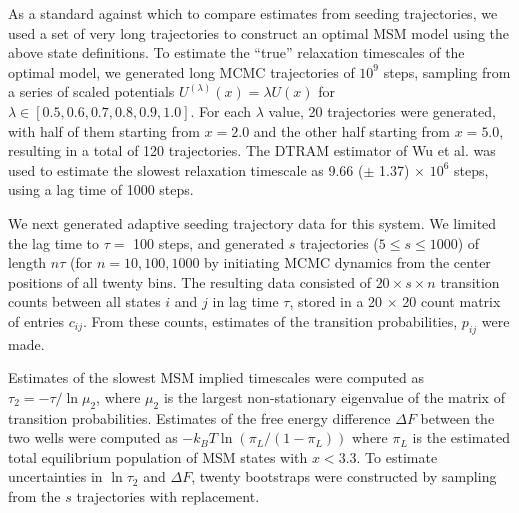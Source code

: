 \documentclass[%
 aip,
rsi,%
 amsmath,amssymb,
 reprint,%
]{revtex4-1}
\begin{document}
As a standard against which to compare estimates from seeding trajectories, we used a set of very long trajectories to construct an optimal MSM model using the above state definitions.   To estimate the  ``true'' relaxation timescales of the optimal model, we generated long MCMC trajectories of $10^9$ steps, sampling from a series of scaled potentials $U^{(\lambda)}(x) = \lambda U(x)$ for $\lambda \in [0.5, 0.6, 0.7, 0.8, 0.9, 1.0]$. For each $\lambda$ value, 20 trajectories were generated, with half of them starting from $x=2.0$ and the other half starting from $x=5.0$, resulting in a total of 120 trajectories.  The DTRAM estimator of Wu et al.\cite{Wu:2014jy} was used to estimate the slowest relaxation timescale as 9.66 ($\pm$ 1.37) $\times$ $10^6$ steps, using a lag time of 1000 steps.

We next generated adaptive seeding trajectory data for this system.  We limited the lag time to $\tau =$ 100 steps, and generated $s$ trajectories ($5\leq s \leq 1000$) of length $n\tau$ (for $n=10,100,1000$ by initiating MCMC dynamics from the center positions of all twenty bins.  The resulting data consisted of $20 \times s \times n$ transition counts between all states $i$ and $j$ in lag time $\tau$, stored in a 20 $\times$ 20 count matrix of entries $c_{ij}$.  From these counts, estimates of the transition probabilities, $p_{ij}$ were made. 

Estimates of the slowest MSM implied timescales were computed as $\tau_2 = -\tau/\ln \mu_2$, where $\mu_2$ is the largest non-stationary eigenvalue of the matrix of transition probabilities.  Estimates of the free energy difference $\Delta F$ between the two wells were computed as $-k_BT \ln (\pi_L/(1-\pi_L))$ where $\pi_L$ is the estimated total equilibrium population of MSM states with $x<3.3$. To estimate uncertainties in $\ln \tau_2$ and $\Delta F$, twenty bootstraps were constructed by sampling from the $s$ trajectories with replacement.
\end{document}
